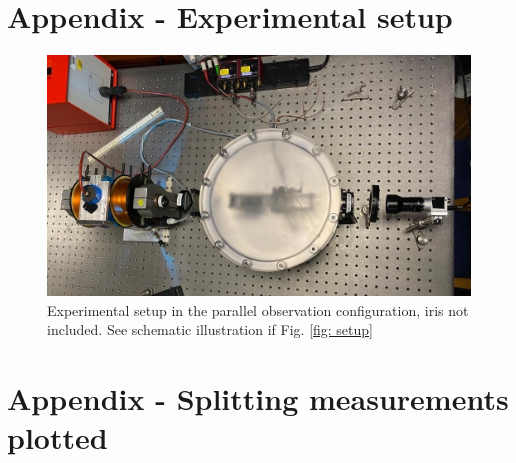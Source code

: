 \documentclass[11pt]{article}
\begin{document}
\section{Appendix - Experimental setup} \label{sec: app setup}
\begin{figure}[h!]
    \centering
    \includegraphics[width=0.65\linewidth]{setup photo.jpeg}
    \captionsetup{justification=centering}
    \caption{Experimental setup in the parallel observation configuration, iris not included. See schematic illustration if Fig. \ref{fig: setup}}
    \label{fig: setup photo}
\end{figure}

\newpage

\section{Appendix - Splitting measurements plotted}
\end{document}
